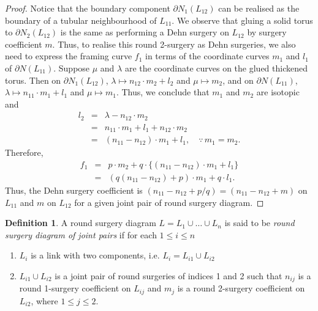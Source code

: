 \documentclass{amsart}
\theoremstyle{plain}
\theoremstyle{remark}
\theoremstyle{definition}
\newtheorem{defn}{Definition}
\newcommand{\dd}{\partial}
\begin{document}
\begin{proof}
Notice that the boundary component $\dd N_1(L_{12})$ %
can be realised as the boundary of a tubular neighbourhood of $L_{11}$. 
We observe that gluing a solid torus to $\dd N_2(L_{12})$ is the same as performing a Dehn surgery on $L_{12}$ by surgery coefficient $m$. 
Thus, to realise this round 2-surgery as Dehn surgeries, we also need to express the framing curve $f_1$ in terms of the coordinate curves $m_1$ and $l_1$ of $\partial N(L_{11})$.
Suppose $\mu$ and $\lambda$ are the coordinate curves on the glued thickened torus. 
Then on $\partial N_1(L_{12})$, $\lambda \mapsto n_{12} \cdot m_2 + l_2$ and $\mu \mapsto m_2$, and on $\partial N(L_{11})$, $\lambda \mapsto n_{11} \cdot m_1 + l_1$ and $\mu \mapsto m_1$. 
Thus, we conclude that $m_1$ and $m_2$ are isotopic and  
\begin{eqnarray*}
        l_2&= &\lambda - n_{12} \cdot m_2\\
        &= & n_{11} \cdot m_1 + l_1  + n_{12}\cdot m_2\\
        &= & (n_{11}-n_{12}) \cdot m_1 + l_1, \quad \because \, m_1=m_2. 
\end{eqnarray*}
Therefore, 
\begin{eqnarray*}
        f_1 &= & p\cdot m_2 + q \cdot\{(n_{11}-n_{12})\cdot m_1 +l_1\}\\
        &=& (q(n_{11}-n_{12}) +p) \cdot m_1 + q \cdot l_1.
\end{eqnarray*}
Thus, the Dehn surgery coefficient is $(n_{11}-n_{12}+p/q) = (n_{11}-n_{12}+m)$ on $L_{11}$ and $m$ on $L_{12}$ for a given joint pair of round surgery diagram. 
\end{proof}

\begin{defn}
A round surgery diagram $L = L_{1} \cup \ldots\cup L_{n}$ is said to be {\it round surgery diagram of joint pairs} if for each $1\leq i\leq n$
\begin{enumerate}
    \item $L_i$ is a link with two components, i.e. $L_i = L_{i1} \cup L_{i2}$
    \item $L_{i1} \cup L_{i2}$ is a joint pair of round surgeries of indices 1 and 2 such that $n_{ij}$ is a round 1-surgery coefficient on $L_{ij}$ and $m_j$ is a round 2-surgery coefficient on $L_{i2}$, where $1\leq j\leq 2$. 
\end{enumerate} 
\end{defn}
\end{document}

